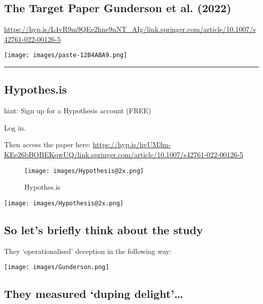 \documentclass[
  letterpaper,
  DIV=11,
  numbers=noendperiod]{scrartcl}
\begin{document}
\hypertarget{the-target-paper-gunderson2022}{%
\subsection{The Target Paper Gunderson et al.
(2022)}\label{the-target-paper-gunderson2022}}

\url{https://hyp.is/L4vR9m9QEe2hne9nNT_AIg/link.springer.com/article/10.1007/s42761-022-00126-5}

\texttt{[image: images/paste-12B4ABA9.png]}

\begin{center}\rule{0.5\linewidth}{0.5pt}\end{center}

\hypertarget{hypothes.is}{%
\subsection{Hypothes.is}\label{hypothes.is}}

hint: Sign up for a Hypothesis account (FREE)

Log in.

Then access the paper here:
\url{https://hyp.is/hvUM3m-KEe26bBOBEKqwUQ/link.springer.com/article/10.1007/s42761-022-00126-5}

\begin{figure}

{\centering \texttt{[image: images/Hypothesis@2x.png]}

}

\caption{Hypothes.is}

\end{figure}

\texttt{[image: images/Hypothesis@2x.png]}

\hypertarget{so-lets-briefly-think-about-the-study}{%
\subsection{So let's briefly think about the
study}\label{so-lets-briefly-think-about-the-study}}

They `operationalised' deception in the following way:

\texttt{[image: images/Gunderson.png]}

\hypertarget{they-measured-duping-delight}{%
\subsection{They measured `duping
delight'\ldots{}}\label{they-measured-duping-delight}}
\end{document}
